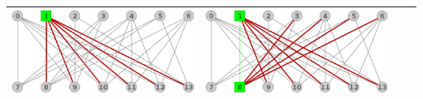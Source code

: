 \begin{center}
\begin{tabular}{ |c||c||c||c| }
		\includegraphics[scale = 0.18]{img/ej3/constructiva_golosa/bipartito2_st11.png} &
		\includegraphics[scale = 0.18]{img/ej3/constructiva_golosa/bipartito2_st12.png} \\
		\hline
		\end{tabular}
	\end{center}
	

